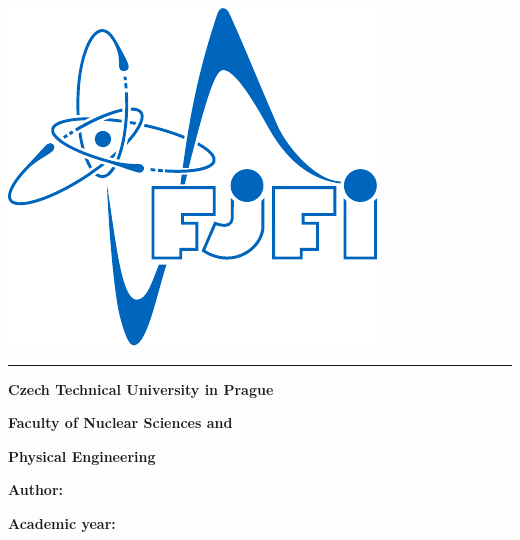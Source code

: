 {\begin{titlepage}
\begin{minipage}[b][\textheight]{0.15\textwidth}
      \includegraphics[width=\textwidth]{images/logofjfi.pdf} \par
    \end{minipage}
    \hspace{0.05\textwidth}
    \doccol \rule{2pt}{\textheight}
    \hspace{0.05\textwidth}
    \begin{minipage}[b][\textheight]{0.7\textwidth}
      \begin{minipage}[b]{\textwidth}
        \centering \doccol \Large
        \textbf{Czech Technical University in Prague} \par
        \textbf{Faculty of Nuclear Sciences and} \par
        \textbf{Physical Engineering}
      \end{minipage} \par
      \vfill
      \begin{minipage}[b]{\textwidth}
        \centering  \doccol \Huge \textbf{\@title}
      \end{minipage} \par
      \vspace{1cm}
      \begin{minipage}[b]{\textwidth}
        \centering \doccol \Large \textit{\@subtitle}
      \end{minipage} \par
      \vfill
      \begin{minipage}[b]{0.3\textwidth}
        \doccol
        \textbf{Author:} \par
        \textbf{Academic year:}
      \end{minipage}
      \hspace{0.05\textwidth}
      \begin{minipage}[b]{0.65\textwidth}
        \doccol
        \@author \par
        \@academicyear
      \end{minipage}
    \end{minipage}
  \end{titlepage}
  \cleardoublepage

}
